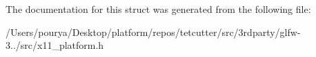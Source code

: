 The documentation for this struct was generated from the following file\+:\begin{DoxyCompactItemize}
\item 
/\+Users/pourya/\+Desktop/platform/repos/tetcutter/src/3rdparty/glfw-\/3../src/x11\+\_\+platform.\+h\end{DoxyCompactItemize}
